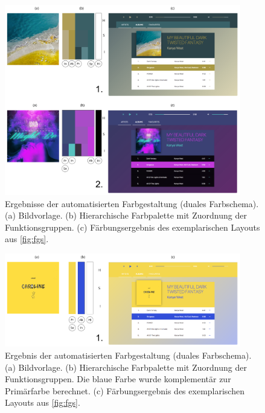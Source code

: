 \begin{figure}[h]
\centering
\includegraphics[width=0.92\textwidth]{img/results_dual.png}
\caption{Ergebnisse der automatisierten Farbgestaltung (duales Farbschema). (a) Bildvorlage. (b) Hierarchische Farbpalette mit Zuordnung der Funktionsgruppen. (c) Färbungsergebnis des exemplarischen Layouts aus \autoref{fig:fgs}.}
\label{fig:results_dual}
\end{figure}

\begin{figure}[h]
\centering
\includegraphics[width=0.92\textwidth]{img/results_monochrom.png}
\caption{Ergebnis der automatisierten Farbgestaltung (duales Farbschema). (a) Bildvorlage. (b) Hierarchische Farbpalette mit Zuordnung der Funktionsgruppen.  Die blaue Farbe wurde komplementär zur Primärfarbe berechnet. (c) Färbungsergebnis des exemplarischen Layouts aus \autoref{fig:fgs}.}
\label{fig:results_monochrom}
\end{figure}

